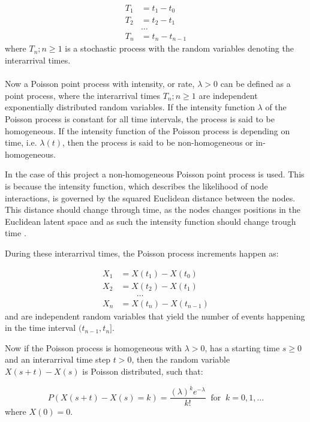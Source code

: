 \begin{align*}
T_1 &= t_1 - t_0 \\
T_2 &= t_2 - t_1 \\
&\dots \\
T_n &= t_n - t_{n-1}
\end{align*}
where ${T_n ; n \ge 1}$ is a stochastic process with the random variables denoting the interarrival times.
\\\\
Now a Poisson point process with intensity, or rate, $\lambda > 0$ can be defined as a point process, where the interarrival times ${T_n ; n \ge 1}$ are independent exponentially distributed random variables. 
If the intensity function $\lambda$ of the Poisson process is constant for all time intervals, the process is said to be homogeneous. 
If the intensity function of the Poisson process is depending on time, i.e. $\lambda(t)$, then the process is said to be non-homogeneous or in-homogeneous.

In the case of this project a non-homogeneous Poisson point process is used. 
This is because the intensity function, which describes the likelihood of node interactions, is governed by the squared Euclidean distance between the nodes. 
This distance should change through time, as the nodes changes positions in the Euclidean latent space and as such the intensity function should change trough time \cite{Bas2019AProcess}.

During these interarrival times, the Poisson process increments happen as:

\begin{align*}
X_1 &= X(t_1) - X(t_0) \\
X_2 &= X(t_2) - X(t_1) \\
&\;\;\;\;\;\;\;\dots \\
X_n &= X(t_n) - X(t_{n-1})
\end{align*}
and are independent random variables that yield the number of events happening in the time interval $(t_{n-1}, t_n]$. 

Now if the Poisson process is homogeneous with $\lambda > 0$, has a starting time $s \ge 0$ and an interarrival time step $t > 0$, then the random variable $X(s+t) - X(s)$ is Poisson distributed, such that:

\begin{equation}
    P(X(s+t) - X(s) = k) = \frac{(\lambda)^k e^{-\lambda}}{k!} \;\; \text{for} \;\; k=0,1,\dots
\end{equation}
where $X(0) = 0$.


